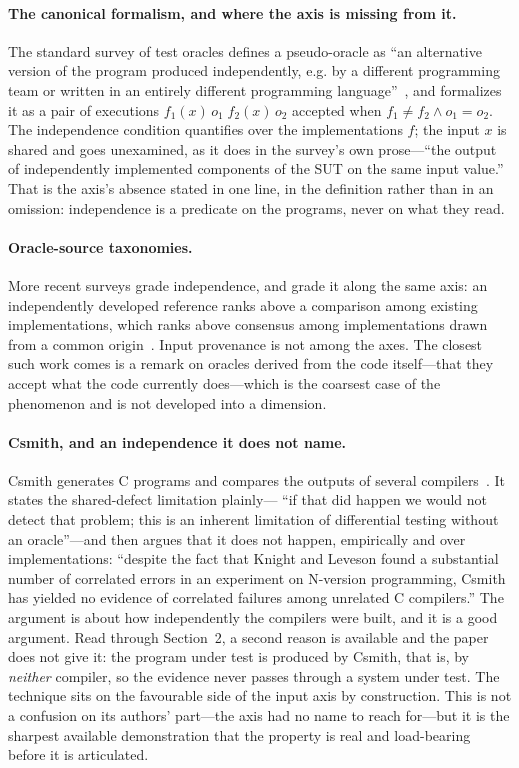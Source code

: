 \paragraph{The canonical formalism, and where the axis is missing from it.}
The standard survey of test oracles defines a pseudo-oracle as ``an alternative
version of the program produced independently, e.g. by a different programming team
or written in an entirely different programming language''~\cite{barr2015oracle}, and
formalizes it as a pair of executions $f_1(x)\,o_1\;f_2(x)\,o_2$ accepted when
$f_1 \neq f_2 \wedge o_1 = o_2$. The independence condition quantifies over the
implementations $f$; the input $x$ is shared and goes unexamined, as it does in the
survey's own prose---``the output of independently implemented components of the SUT
on the same input value.'' That is the axis's absence stated in one line, in the
definition rather than in an omission: independence is a predicate on the programs,
never on what they read.

\paragraph{Oracle-source taxonomies.}
More recent surveys grade independence, and grade it along the same axis: an
independently developed reference ranks above a comparison among existing
implementations, which ranks above consensus among implementations drawn from a
common origin~\cite{oraclesurvey2026}. Input provenance is not among the axes. The
closest such work comes is a remark on oracles derived from the code itself---that
they accept what the code currently does---which is the coarsest case of the
phenomenon and is not developed into a dimension.

\paragraph{Csmith, and an independence it does not name.}
Csmith generates C programs and compares the outputs of several
compilers~\cite{yang2011csmith}. It states the shared-defect limitation plainly---%
``if that did happen we would not detect that problem; this is an inherent limitation
of differential testing without an oracle''---and then argues that it does not happen,
empirically and over implementations: ``despite the fact that Knight and Leveson found
a substantial number of correlated errors in an experiment on N-version programming,
Csmith has yielded no evidence of correlated failures among unrelated C compilers.''
The argument is about how independently the compilers were built, and it is a good
argument. Read through Section~2, a second reason is available and the paper does not
give it: the program under test is produced by Csmith, that is, by \emph{neither}
compiler, so the evidence never passes through a system under test. The technique sits
on the favourable side of the input axis by construction. This is not a confusion on
its authors' part---the axis had no name to reach for---but it is the sharpest
available demonstration that the property is real and load-bearing before it is
articulated.

